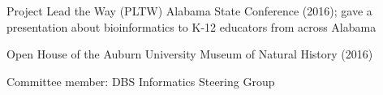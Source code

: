\begin{tightItemize}
    \item Project Lead the Way (PLTW) Alabama State Conference (2016); gave a
        presentation about bioinformatics to K-12 educators from across Alabama
    \item Open House of the Auburn University Museum of Natural History (2016)
    \item Committee member: DBS Informatics Steering Group
\end{tightItemize}
